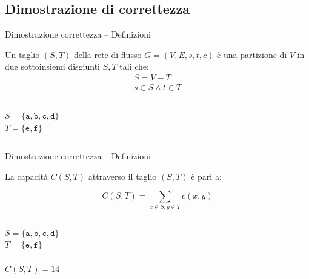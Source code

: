 \subsection{Dimostrazione di correttezza}

\begin{frame}{Dimostrazione correttezza -- Definizioni}

\vspace{-12pt}
\begin{myboxtitle}[Taglio]
Un \alert{taglio} $(S,T)$ della rete di flusso 
$G=(V,E,s,t,c)$ è una partizione di $V$ in due sottoinsiemi disgiunti $S,T$ tali che:
\smallskip
\begin{eqnarray*}
    S = V-T \\
    s \in S \wedge t \in T
\end{eqnarray*}
\end{myboxtitle}

\vspace{-12pt}
\begin{columns}[T]
\vspace{18pt}
$S = \{ \mathtt{a}, \mathtt{b}, \mathtt{c}, \mathtt{d} \}$\\
$T = \{ \mathtt{e}, \mathtt{f} \}$\\
\end{columns}


\end{frame}


\begin{frame}{Dimostrazione correttezza -- Definizioni}

\vspace{-12pt}
\begin{myboxtitle}
La \alert{capacità} $C(S,T)$ attraverso il taglio $(S,T)$ è pari a:

\[
  C(S,T) = \sum_{x \in S, y \in T} c(x,y)
\]
\end{myboxtitle}

\vspace{-12pt}
\begin{columns}[T]
\vspace{18pt}
$S = \{ \mathtt{a}, \mathtt{b}, \mathtt{c}, \mathtt{d} \}$\\
$T = \{ \mathtt{e}, \mathtt{f} \}$\\
~\\
$C(S,T) = 14$
\end{columns}

\end{frame}

